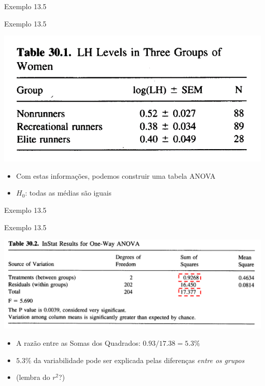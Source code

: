 \documentclass{beamer}
\begin{document}
\begin{frame}[label=exemplo13.5-tabela]{\small Exemplo 13.5}
  \begin{exampleblock}{Exemplo 13.5}
    \begin{center}
      \includegraphics[width=.6\textwidth]{Cap13-30/exemplo13_5-1}
    \end{center}
    \begin{itemize}
      \footnotesize
    \item Com estas informações, podemos construir uma tabela ANOVA
      \small
    \item $H_0$: todas as médias são iguais
    \end{itemize}
  \end{exampleblock}
\end{frame}

\begin{frame}{\small Exemplo 13.5}
  \begin{exampleblock}{Exemplo 13.5}
    \begin{center}
      \includegraphics[width=.8\textwidth]{Cap13-30/exemplo13_5-2}
    \end{center}
    \bigskip
    \begin{itemize}
      \scriptsize
    \item A razão entre as Somas dos Quadrados: $0.93/17.38 = 5.3\%$
    \item $5.3\%$ da variabilidade pode ser explicada pelas diferenças {\em entre os grupos}
    \item (lembra do $r^2$?)
    \end{itemize}
  \end{exampleblock}
\end{frame}
\end{document}
